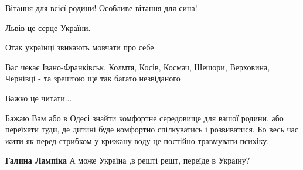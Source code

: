 \begin{itemize}
 
Вітання для всієї родини! Особливе вітання для сина!

 
Львів це серце України.

 
Отак українці звикають мовчати про себе

 
Вас чекає Івано-Франківськ, Колмтя, Косів, Космач, Шешори, Верховина, Чернівці - та зрештою ще так багато незвіданого💫

 
Важко це читати...

 

Бажаю Вам або в Одесі знайти комфортне середовище для вашої родини, або
переїхати туди, де дитині буде комфортно спілкуватись і розвиватися. Бо весь
час жити як перед стрибком у крижану воду це постійно травмувати психіку.

\begin{itemize}
 
\textbf{Галина Лампіка} А може Україна ,в решті решт, переїде в Україну?
\end{itemize}

\end{itemize}

